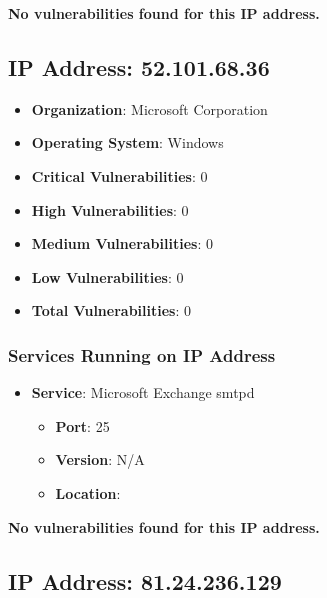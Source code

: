 \documentclass{article}
\begin{document}
\textbf{No vulnerabilities found for this IP address.}




\clearpage



\subsection*{IP Address: 52.101.68.36}

\begin{itemize}
    \item \textbf{Organization}: Microsoft Corporation
    \item \textbf{Operating System}:  Windows 
    \item \textbf{Critical Vulnerabilities}: 0
    \item \textbf{High Vulnerabilities}: 0
    \item \textbf{Medium Vulnerabilities}: 0
    \item \textbf{Low Vulnerabilities}: 0
    \item \textbf{Total Vulnerabilities}: 0
\end{itemize}

\subsubsection*{Services Running on IP Address}

\begin{itemize}
    
        \item \textbf{Service}: Microsoft Exchange smtpd
        \begin{itemize}
            \item \textbf{Port}: 25
            \item \textbf{Version}:  N/A 
            \item \textbf{Location}: \href{  }{  }
        \end{itemize}
    
\end{itemize}


\textbf{No vulnerabilities found for this IP address.}




\clearpage



\subsection*{IP Address: 81.24.236.129}
\end{document}
